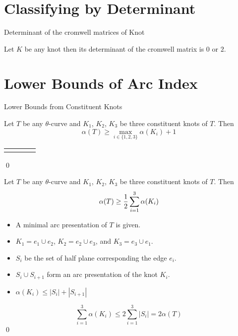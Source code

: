 \section{Classifying by Determinant}
\begin{frame}{Determinant of the cromwell matrices of Knot}
	\begin{thm}
		Let $K$ be any knot then its determinant of the cromwell matrix is $0$ or $2$.
	\end{thm}
\end{frame}

\section{Lower Bounds of Arc Index}

\begin{frame}{Lower Bounds from Constituent Knots}
	\begin{thm}
		Let $T$ be any $\theta$-curve
		and $K_1$, $K_2$, $K_3$ be three constituent knots of $T$.
		Then
		\[
			\alpha(T) \ge \max_{i\in\{1,2,3\}} \alpha(K_i) + 1
		\]
	\end{thm}

	\mypf

	\begin{tabu}{X[c]X[c]X[c]X[c]}
			 &
			 &
			 &
	\end{tabu}
	\hfill\qed
\end{frame}


\begin{frame}
	\bigskip
	\begin{thm}
		Let $T$ be any $\theta$-curve
		and $K_1$, $K_2$, $K_3$ be three constituent knots of $T$.
		Then
		\[
			\centerline{$\displaystyle\alpha(T) \ge \frac12 \sum_{i=1}^3\alpha(K_i)$}
		\]
	\end{thm}
	
	\mypf

	\begin{itemize}
		\item A minimal arc presentation of $T$ is given.
		\item $K_1 = e_1\cup e_2$, $K_2 = e_2\cup e_3$, and $K_3 = e_3\cup e_1$.
		\item $S_i$ be the set of half plane corresponding the edge $e_i$.
		\item $S_i\cup S_{i+1}$ form an arc presentation of the knot $K_i$.
		\item $\alpha(K_i) \le |S_i| + |S_{i+1}|$
	\end{itemize}
	\[
		\sum_{i=1}^3 \alpha(K_i) \le 2\sum_{i=1}^3|S_i| = 2 \alpha(T)
	\]
	\hfill\qed
\end{frame}


